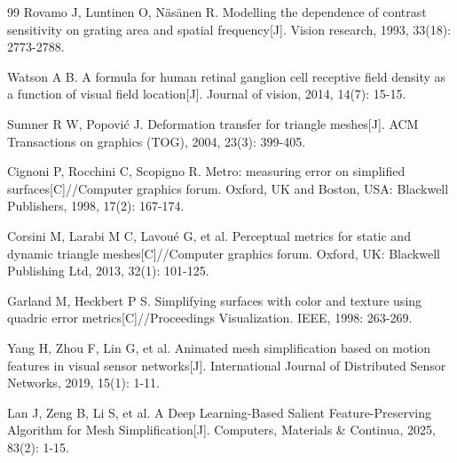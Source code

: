 \begin{thebibliography}{99}
Rovamo J, Luntinen O, Näsänen R. Modelling the dependence of contrast sensitivity on grating area and spatial frequency[J]. Vision research, 1993, 33(18): 2773-2788.

Watson A B. A formula for human retinal ganglion cell receptive field density as a function of visual field location[J]. Journal of vision, 2014, 14(7): 15-15.


Sumner R W, Popović J. Deformation transfer for triangle meshes[J]. ACM Transactions on graphics (TOG), 2004, 23(3): 399-405.

Cignoni P, Rocchini C, Scopigno R. Metro: measuring error on simplified surfaces[C]//Computer graphics forum. Oxford, UK and Boston, USA: Blackwell Publishers, 1998, 17(2): 167-174.


Corsini M, Larabi M C, Lavoué G, et al. Perceptual metrics for static and dynamic triangle meshes[C]//Computer graphics forum. Oxford, UK: Blackwell Publishing Ltd, 2013, 32(1): 101-125.


Garland M, Heckbert P S. Simplifying surfaces with color and texture using quadric error metrics[C]//Proceedings Visualization. IEEE, 1998: 263-269.

Yang H, Zhou F, Lin G, et al. Animated mesh simplification based on motion features in visual sensor networks[J]. International Journal of Distributed Sensor Networks, 2019, 15(1): 1-11.

Lan J, Zeng B, Li S, et al. A Deep Learning-Based Salient Feature-Preserving Algorithm for Mesh Simplification[J]. Computers, Materials \& Continua, 2025, 83(2): 1-15.



\end{thebibliography}



